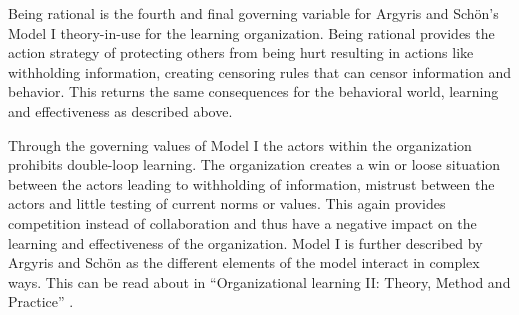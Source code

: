 Being rational is the fourth and final governing variable for Argyris and Schön's Model I theory-in-use for the learning organization. Being rational provides the action strategy of protecting others from being hurt resulting in actions like withholding information, creating censoring rules that can censor information and behavior. This returns the same consequences for the behavioral world, learning and effectiveness as described above. 

Through the governing values of Model I the actors within the organization prohibits double-loop learning. The organization creates a win or loose situation between the actors leading to withholding of information, mistrust between the actors and little testing of current norms or values. This again provides competition instead of collaboration and thus have a negative impact on the learning and effectiveness of the organization. Model I is further described by Argyris and Schön as the different elements of the model interact in complex ways. This can be read about in ``Organizational learning II: Theory, Method and Practice'' \cite{Argyris1996}.


